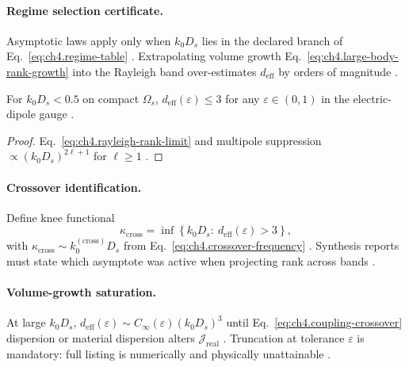 
\paragraph{Regime selection certificate.}
Asymptotic laws apply only when \(k_{0}D_{s}\) lies in the declared branch of Eq.~\eqref{eq:ch4.regime-table}
\cite{jackson1999,stratton1941,hansen1988}. Extrapolating volume growth Eq.~\eqref{eq:ch4.large-body-rank-growth} into the Rayleigh band
over-estimates \(d_{\mathrm{eff}}\) by orders of magnitude \cite{harrington2001,devaney2004}.

\begin{theorem}
\label{thm:ch4.rayleigh-dipole-cap}
For \(k_{0}D_{s}<0.5\) on compact \(\Omega_{s}\), \(d_{\mathrm{eff}}(\varepsilon)\le3\) for any \(\varepsilon\in(0,1)\) in the
electric-dipole gauge \cite{jackson1999,stratton1941,harrington2001,hansen1988}.
\end{theorem}
\begin{proof}
Eq.~\eqref{eq:ch4.rayleigh-rank-limit} and multipole suppression \(\propto(k_{0}D_{s})^{2\ell+1}\) for \(\ell\ge1\)
\cite{jackson1999,stratton1941}.
\end{proof}

\paragraph{Crossover identification.}
Define knee functional
\begin{equation}
\label{eq:ch4.crossover-knee}
\kappa_{\mathrm{cross}}=\inf\left\{k_{0}D_{s}:\ d_{\mathrm{eff}}(\varepsilon)>3\right\},
\end{equation}
with \(\kappa_{\mathrm{cross}}\sim k_{0}^{(\mathrm{cross})}D_{s}\) from Eq.~\eqref{eq:ch4.crossover-frequency} \cite{hansen1988,harrington2001}.
Synthesis reports must state which asymptote was active when projecting rank across bands \cite{devaney2004,stratton1941}.

\paragraph{Volume-growth saturation.}
At large \(k_{0}D_{s}\), \(d_{\mathrm{eff}}(\varepsilon)\sim C_{\infty}(\varepsilon)(k_{0}D_{s})^{3}\) until
Eq.~\eqref{eq:ch4.coupling-crossover} dispersion or material dispersion alters \(\mathcal{J}_{\mathrm{real}}\) \cite{stratton1941,jackson1999}.
Truncation at tolerance \(\varepsilon\) is mandatory: full listing is numerically and physically unattainable \cite{hansen1988,harrington2001}.

